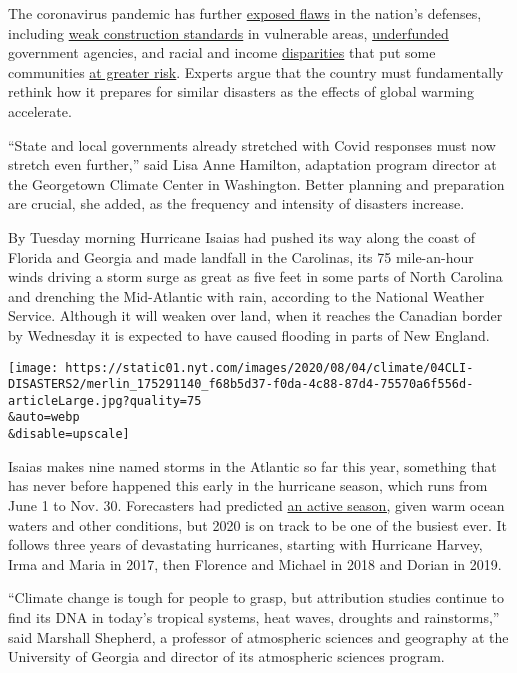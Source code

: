 The coronavirus pandemic has further
\href{https://www.nytimes.com/2020/05/22/climate/fema-volunteer-disaster-response.html}{exposed
flaws} in the nation's defenses, including
\href{https://www.nytimes.com/2019/10/26/climate/building-codes-secret-deal.html}{weak
construction standards} in vulnerable areas,
\href{https://newrepublic.com/article/158486/towns-arent-equipped-handle-climate-emergencies}{underfunded}
government agencies, and racial and income
\href{https://www.nytimes.com/2020/05/17/climate/pollution-poverty-coronavirus.html}{disparities}
that put some communities
\href{https://www.nytimes.com/2020/07/24/climate/houston-flooding-race.html}{at
greater risk}. Experts argue that the country must fundamentally rethink
how it prepares for similar disasters as the effects of global warming
accelerate.

``State and local governments already stretched with Covid responses
must now stretch even further,'' said Lisa Anne Hamilton, adaptation
program director at the Georgetown Climate Center in Washington. Better
planning and preparation are crucial, she added, as the frequency and
intensity of disasters increase.

By Tuesday morning Hurricane Isaias had pushed its way along the coast
of Florida and Georgia and made landfall in the Carolinas, its 75
mile-an-hour winds driving a storm surge as great as five feet in some
parts of North Carolina and drenching the Mid-Atlantic with rain,
according to the National Weather Service. Although it will weaken over
land, when it reaches the Canadian border by Wednesday it is expected to
have caused flooding in parts of New England.

\texttt{[image: https://static01.nyt.com/images/2020/08/04/climate/04CLI-DISASTERS2/merlin\_175291140\_f68b5d37-f0da-4c88-87d4-75570a6f556d-articleLarge.jpg?quality=75\\\&auto=webp\\\&disable=upscale]}

Isaias makes nine named storms in the Atlantic so far this year,
something that has never before happened this early in the hurricane
season, which runs from June 1 to Nov. 30. Forecasters had predicted
\href{https://www.nytimes.com/2020/05/21/climate/hurricane-season-2020-noaa.html}{an
active season,} given warm ocean waters and other conditions, but 2020
is on track to be one of the busiest ever. It follows three years of
devastating hurricanes, starting with Hurricane Harvey, Irma and Maria
in 2017, then Florence and Michael in 2018 and Dorian in 2019.

``Climate change is tough for people to grasp, but attribution studies
continue to find its DNA in today's tropical systems, heat waves,
droughts and rainstorms,'' said Marshall Shepherd, a professor of
atmospheric sciences and geography at the University of Georgia and
director of its atmospheric sciences program.

